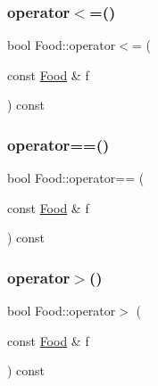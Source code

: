 \mbox{\label{classFood_a69f902e1e0268b3ad9d99f7a46ab3ae5_a69f902e1e0268b3ad9d99f7a46ab3ae5}} 
\subsubsection{\texorpdfstring{operator$<$=()}{operator<=()}}
{\footnotesize\ttfamily bool Food\+::operator$<$= (\begin{DoxyParamCaption}\item[{const \hyperlink{classFood}{Food} \&}]{f }\end{DoxyParamCaption}) const\hspace{0.3cm}{\ttfamily [inherited]}}

\mbox{\label{classFood_afaba8cd54420aecea26a207f0fd0251a_afaba8cd54420aecea26a207f0fd0251a}} 
\subsubsection{\texorpdfstring{operator==()}{operator==()}}
{\footnotesize\ttfamily bool Food\+::operator== (\begin{DoxyParamCaption}\item[{const \hyperlink{classFood}{Food} \&}]{f }\end{DoxyParamCaption}) const\hspace{0.3cm}{\ttfamily [inherited]}}

\mbox{\label{classFood_a63e0188fe0464bc533d800d8cdb17984_a63e0188fe0464bc533d800d8cdb17984}} 
\subsubsection{\texorpdfstring{operator$>$()}{operator>()}}
{\footnotesize\ttfamily bool Food\+::operator$>$ (\begin{DoxyParamCaption}\item[{const \hyperlink{classFood}{Food} \&}]{f }\end{DoxyParamCaption}) const\hspace{0.3cm}{\ttfamily [inherited]}}

